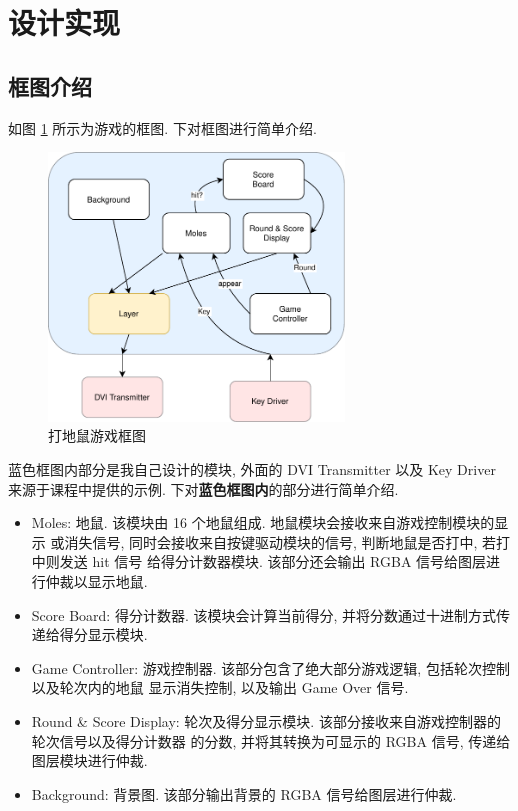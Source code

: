 \section{设计实现}

\subsection{框图介绍}

如图 \ref{fig:arch} 所示为游戏的框图. 下对框图进行简单介绍. 

\begin{figure}[htbp]
    \centering
    \includegraphics[width=0.7\textwidth]{res/img/arch.pdf}
    \caption{打地鼠游戏框图}
    \label{fig:arch}
\end{figure}

蓝色框图内部分是我自己设计的模块, 外面的 DVI Transmitter 以及 Key Driver 
来源于课程中提供的示例. 下对\textbf{蓝色框图内}的部分进行简单介绍. 

\begin{itemize}
    \item Moles: 地鼠. 该模块由 16 个地鼠组成. 地鼠模块会接收来自游戏控制模块的显示
    或消失信号, 同时会接收来自按键驱动模块的信号, 判断地鼠是否打中, 若打中则发送 hit 信号
    给得分计数器模块. 该部分还会输出 RGBA 信号给图层进行仲裁以显示地鼠.
    \item Score Board: 得分计数器. 该模块会计算当前得分, 并将分数通过十进制方式传递给得分显示模块. 
    \item Game Controller: 游戏控制器. 该部分包含了绝大部分游戏逻辑, 包括轮次控制以及轮次内的地鼠
    显示消失控制, 以及输出 Game Over 信号. 
    \item Round \& Score Display: 轮次及得分显示模块. 该部分接收来自游戏控制器的轮次信号以及得分计数器
    的分数, 并将其转换为可显示的 RGBA 信号, 传递给图层模块进行仲裁. 
    \item Background: 背景图. 该部分输出背景的 RGBA 信号给图层进行仲裁. 
\end{itemize}

